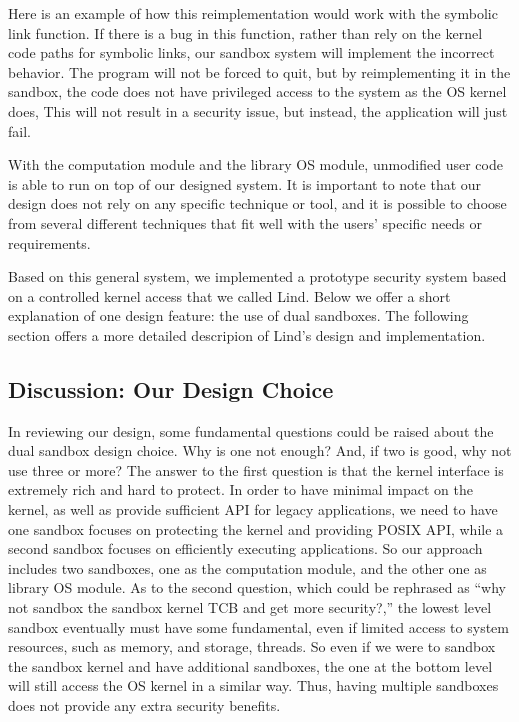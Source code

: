 Here is an example of how this reimplementation would work with the symbolic link function.
If there is a bug in this function, rather than rely on the kernel code paths
for symbolic links, our sandbox system will implement the incorrect behavior.
The program will not be forced to quit, but by reimplementing it in the sandbox,
the code does not have privileged access to the system as the OS kernel does,
This will not result in a security issue, but instead, the application will just fail.

With the computation module and the library OS module, unmodified user code is able to run on top of our designed system.
It is important to note that our design does not rely on any specific technique or tool, and it is possible
to choose from several different techniques that fit well with the users' specific needs or requirements.

Based on this general system, we implemented a prototype security system based on a controlled kernel access that we called Lind.
Below we offer a short explanation of one design feature: the use of dual sandboxes. The following section offers a more detailed descripion of Lind's design and implementation.

\subsection{Discussion: Our Design Choice}

In reviewing our design, some fundamental questions could be raised about the dual sandbox design choice.
Why is one not enough? And, if two is good, why not use three or more?
The answer to the first question is that the kernel interface is extremely rich and hard to protect.
In order to have minimal impact on the kernel, as well as provide sufficient API for legacy applications,
we need to have one sandbox focuses on protecting the kernel and providing POSIX API,
while a second sandbox focuses on efficiently executing applications.
So our approach includes two sandboxes, one as the computation module,
and the other one as library OS module. As to the second question,
which could be rephrased as ``why not sandbox the sandbox kernel TCB and get more security?,''
the lowest level sandbox eventually must have some fundamental,
even if  limited access to system resources, such as memory, and storage, threads.
So even if we were to sandbox the sandbox kernel and have additional sandboxes,
the one at the bottom level will still access the OS kernel in a similar way.
Thus, having multiple sandboxes does not provide any extra security benefits.
